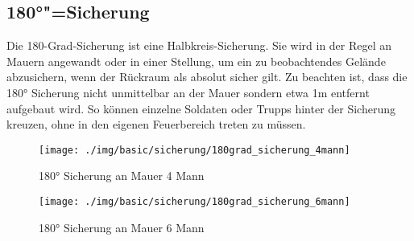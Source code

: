 \subsection{180°"=Sicherung}
	Die 180-Grad-Sicherung ist eine Halbkreis-Sicherung. Sie wird in der Regel an Mauern angewandt oder in einer Stellung, um ein zu beobachtendes Gelände abzusichern, wenn der Rückraum als absolut sicher gilt. Zu beachten ist, dass die 180° Sicherung nicht unmittelbar an der Mauer sondern etwa 1m entfernt aufgebaut wird. So können einzelne Soldaten oder Trupps hinter der Sicherung kreuzen, ohne in den eigenen Feuerbereich treten zu müssen.\\
	\begin{figure}[htbp]
		\centering
		\texttt{[image: ./img/basic/sicherung/180grad\_sicherung\_4mann]}
		\caption{180° Sicherung an Mauer 4 Mann}
	\end{figure}
		
		\begin{figure}[htbp]
			\centering
			\texttt{[image: ./img/basic/sicherung/180grad\_sicherung\_6mann]}
			\caption{180° Sicherung an Mauer 6 Mann}
		\end{figure}
\newpage